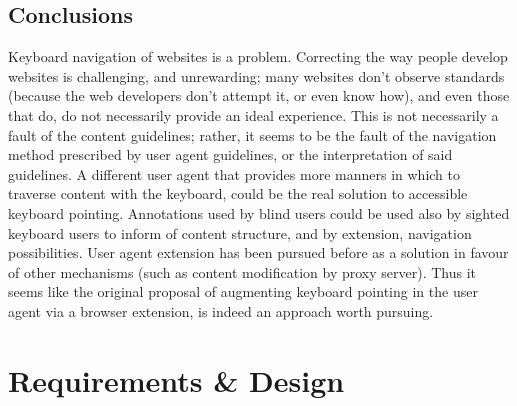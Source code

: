 \documentclass[11pt,openright,a4paper]{report}
\begin{document}
\section{Conclusions}
Keyboard navigation of websites is a problem. Correcting the way people develop websites is challenging, and unrewarding; many websites don't observe standards (because the web developers don't attempt it, or even know how), and even those that do, do not necessarily provide an ideal experience. This is not necessarily a fault of the content guidelines; rather, it seems to be the fault of the navigation method prescribed by user agent guidelines, or the interpretation of said guidelines. A different user agent that provides more manners in which to traverse content with the keyboard, could be the real solution to accessible keyboard pointing. Annotations used by blind users could be used also by sighted keyboard users to inform of content structure, and by extension, navigation possibilities. User agent extension has been pursued before as a solution in favour of other mechanisms (such as content modification by proxy server). Thus it seems like the original proposal of augmenting keyboard pointing in the user agent via a browser extension, is indeed an approach worth pursuing.

\chapter{Requirements \& Design}
\label{chap:reqanddesign}
\newcommand{\reqinit}{
    \newcounter{reqcountbackup}
    \newcounter{reqcount}
    \renewcommand{\thereqcount}{\textbf{R\arabic{reqcount}}}
}

\newcommand{\reqstart}{
    \begin{list}{\thereqcount}{\usecounter{reqcount}}
    \setcounter{reqcount}{\value{reqcountbackup}}
}

\newcommand{\reqreset}{
    \setcounter{reqcountbackup}{0}
    \setcounter{reqcount}{0}
}
\end{document}
